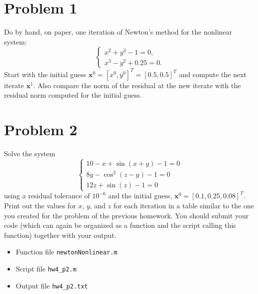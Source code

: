 \newpage

\section{Problem 1}%
\label{sec:problem_1}
Do by hand, on paper, one iteration of Newton's method for the nonlinear system:
\begin{equation*}
  \begin{cases}
    x^{2} + y^{3} - 1 = 0, \\
    x^{3} - y^{2} + 0.25 = 0.
  \end{cases}
\end{equation*}
Start with the initial guess $\mathbf{x}^{0} = [x^{0}, y^{0}]^{T} = [0.5, 0.5]^{T}$ and compute the next iterate $\mathbf{x}^{1}$. Also compare the norm of the residual at the new iterate with the residual norm computed for the initial guess.
\begin{solution}
  \quad \vfill %
\end{solution}

\section{Problem 2}%
\label{sec:problem_2}
Solve the system
\begin{equation*}
  \begin{cases}
    10 - x + \sin(x + y) - 1 = 0 \\
    8 y - \cos^{2}(z - y) - 1 = 0 \\
    12 z + \sin(z) - 1 = 0
  \end{cases}
\end{equation*}
using a residual tolerance of $10^{-6}$ and the initial guess, $\mathbf{x}^{0} = [0.1, 0.25, 0.08]^{T}$. Print out the values for $x$, $y$, and $z$ for each iteration in a table similar to  the one you created for the problem of the previous  homework. You should submit your code (which can again be organized as a function and the script calling this function) together with your output.
\begin{solution}
  \quad
  \begin{itemize}
    \item
      Function file \verb|newtonNonlinear.m|
      
    \item
      Script file \verb|hw4_p2.m|
      
    \item
      Output file \verb|hw4_p2.txt|
      
  \end{itemize}
\end{solution}

